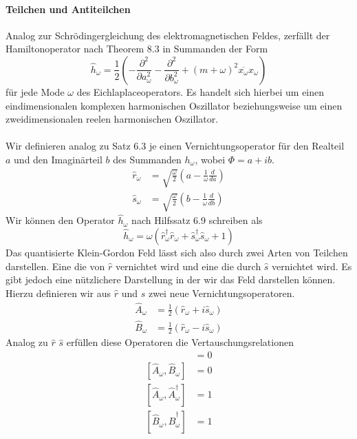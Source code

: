 \documentclass[11pt,a4paper,leqno]{report}
\numberwithin{equation}{chapter}
\begin{document}
\noindent
\paragraph{Teilchen und Antiteilchen}
Analog zur Schr\"odingergleichung des elektromagnetischen Feldes, zerf\"allt der Hamiltonoperator nach Theorem 8.3 in Summanden der Form
	\begin{equation}
	\hat{h}_\omega= \frac{1}{2}(-\frac{\partial^2}{\partial a_\omega^2}-\frac{\partial^2}{\partial b_\omega^2} + (m + \omega)^2 \overline{x_\omega}x_\omega)
\end{equation}
\noindent
f\"ur jede Mode $\omega$ des Eichlaplaceoperators. Es handelt sich hierbei um einen eindimensionalen komplexen harmonischen Oszillator beziehungsweise um einen zweidimensionalen reelen harmonischen Oszillator.\\
\\
Wir definieren analog zu Satz 6.3 je einen Vernichtungsoperator f\"ur den Realteil $a$ und den Imagin\"arteil $b$ des Summanden $h_\omega$, wobei $\Phi = a +ib$.
\begin{align*}
	\hat{r}_\omega &= \sqrt{\frac{\omega}{2}}(a -\frac{1}{\omega}\frac{d}{da})\\
	\hat{s}_\omega &= \sqrt{\frac{\omega}{2}}(b -\frac{1}{\omega}\frac{d}{db})
\end{align*}
\noindent
Wir k\"onnen den Operator $\hat{h}_\omega$ nach Hilfssatz 6.9 schreiben als
\begin{equation*}
	\hat{h}_\omega = \omega(\hat{r}_\omega^\dagger\hat{r}_\omega + \hat{s}_\omega^\dagger\hat{s}_\omega + 1)
\end{equation*}
Das quantisierte Klein-Gordon Feld l\"asst sich also durch zwei Arten von Teilchen darstellen. Eine die von $\hat{r}$ vernichtet wird und eine die durch $\hat{s}$ vernichtet wird.
Es gibt jedoch eine n\"utzlichere Darstellung in der wir das Feld darstellen k\"onnen. Hierzu definieren wir aus $\hat{r}$ und $\hat{s}$ zwei neue Vernichtungsoperatoren.
\begin{align}
	\hat{A}_\omega &= \frac{1}{2}(\hat{r}_\omega + i\hat{s}_\omega)\\
	\hat{B}_\omega &= \frac{1}{2}(\hat{r}_\omega - i\hat{s}_\omega)
\end{align}
Analog zu $\hat{r}$ $\hat{s}$ erf\"ullen diese Operatoren die Vertauschungsrelationen
\begin{align*}
	[\hat{A}_\omega, \hat{B}_\omega^\dagger] &= 0\\
	[\hat{A}_\omega, \hat{B}_\omega] &= 0\\
	[\hat{A}_\omega, \hat{A}_\omega^\dagger] &= 1\\
	[\hat{B}_\omega, \hat{B}_\omega^\dagger] &= 1
\end{align*}
\end{document}

